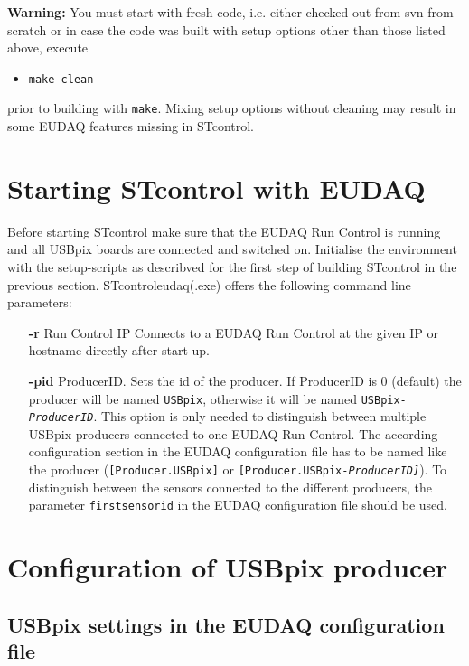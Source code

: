 \documentclass[a4paper,12pt]{article}
\begin{document}
\textbf{Warning:} You must start with fresh code, i.e. either checked out from svn from scratch or in case the code was built 
with setup options other than those listed above, execute
\begin{itemize}
\item {\tt make clean}
\end{itemize}
prior to building with {\tt make}. Mixing setup options without cleaning may result in some EUDAQ features missing in STcontrol.

\section{Starting STcontrol with EUDAQ}

Before starting STcontrol make sure that the EUDAQ Run Control is running and all
USBpix boards are connected and switched on.
Initialise the environment with the setup-scripts as describved for the first step
of building STcontrol in the previous section. STcontrol\textunderscore eudaq(.exe)
offers the following command line parameters:
\begin{itemize}
\item[\bf -r] Run Control IP Connects to a EUDAQ Run Control at the given IP or hostname
directly after start up.
\item[\bf -pid] ProducerID. Sets the id of the producer. 
If ProducerID is 0 (default)
the producer will be named {\tt USBpix}, otherwise it will be named 
{\tt USBpix-\it ProducerID}. This option is only needed to distinguish between multiple USBpix
producers connected to one EUDAQ Run Control. The according configuration
section in the EUDAQ configuration file has to be named like the producer 
({\tt [Producer.USBpix]} or {\tt [Producer.USBpix-\it ProducerID\tt ]}). 
To distinguish between the sensors connected to the different producers, the parameter 
{\tt first\textunderscore sensor\textunderscore id} in the
EUDAQ configuration file should be used.
\end{itemize}

\section{Configuration of USBpix producer}

\subsection{USBpix settings in the EUDAQ configuration file}
\end{document}
